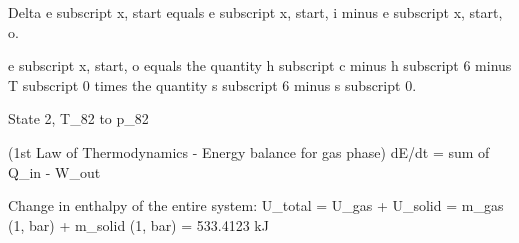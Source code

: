 Delta e subscript x, start equals e subscript x, start, i minus e subscript x, start, o.

e subscript x, start, o equals the quantity h subscript c minus h subscript 6 minus T subscript 0 times the quantity s subscript 6 minus s subscript 0.

State 2, T_82 to p_82

(1st Law of Thermodynamics - Energy balance for gas phase)
dE/dt = sum of Q_in - W_out

Change in enthalpy of the entire system:
U_total = U_gas + U_solid
= m_gas (1, bar) + m_solid (1, bar)
= 533.4123 kJ